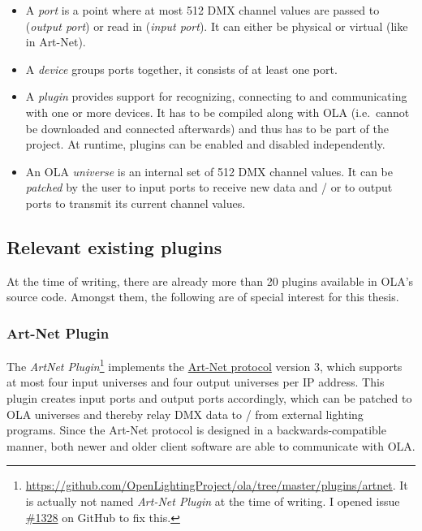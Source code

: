 \begin{itemize}
\tightlist
\item
  A \emph{port} is a point where at most 512 DMX channel values are
  passed to (\emph{output port}) or read in (\emph{input port}). It can
  either be physical or virtual (like in Art-Net).
\item
  A \emph{device} groups ports together, it consists of at least one
  port.
\item
  A \emph{plugin} provides support for recognizing, connecting to and
  communicating with one or more devices. It has to be compiled along
  with OLA (i.e.~cannot be downloaded and connected afterwards) and thus
  has to be part of the project. At runtime, plugins can be enabled and
  disabled independently.
\item
  An OLA \emph{universe} is an internal set of 512 DMX channel values.
  It can be \emph{patched} by the user to input ports to receive new
  data and / or to output ports to transmit its current channel values.
\end{itemize}

\subsection{Relevant existing plugins}\label{relevant-existing-plugins}

At the time of writing, there are already more than 20 plugins available
in OLA's source code. Amongst them, the following are of special
interest for this thesis.

\subsubsection{Art-Net Plugin}\label{art-net-plugin}

The \emph{ArtNet Plugin}\footnote{\url{https://github.com/OpenLightingProject/ola/tree/master/plugins/artnet}.
  It is actually not named \emph{Art-Net Plugin} at the time of writing.
  I opened issue
  \href{https://github.com/OpenLightingProject/ola/issues/1328}{\#1328}
  on GitHub to fix this.} implements the
\protect\hyperlink{sec:art-net-sacn}{Art-Net protocol} version 3, which
supports at most four input universes and four output universes per IP
address. This plugin creates input ports and output ports accordingly,
which can be patched to OLA universes and thereby relay DMX data to /
from external lighting programs. Since the Art-Net protocol is designed
in a backwards-compatible manner, both newer and older client software
are able to communicate with OLA.

